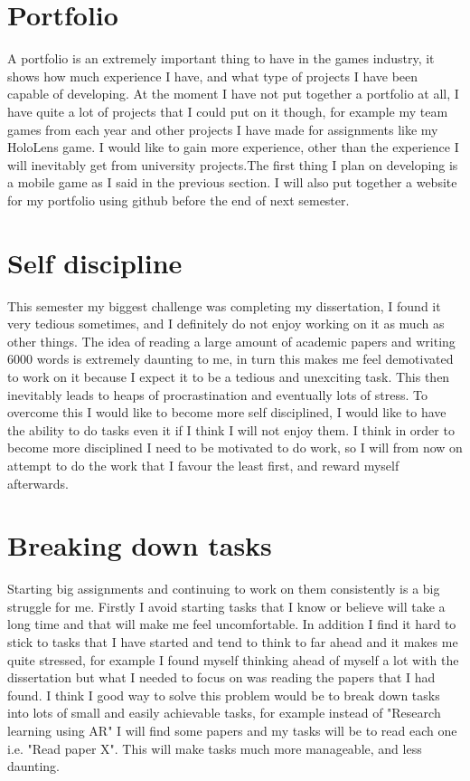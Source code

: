 \documentclass{scrartcl}
\begin{document}
\section{Portfolio}
A portfolio is an extremely important thing to have in the games industry, it shows how much experience I have, and what type of projects I have been capable of developing. At the moment I have not put together a portfolio at all, I have quite a lot of projects that I could put on it though, for example my team games from each year and other projects I have made for assignments like my HoloLens game. I would like to gain more experience, other than the experience I will inevitably get from university projects.The first thing I plan on developing is a mobile game as I said in the previous section. I will also put together a website for my portfolio using github before the end of next semester. 

\section{Self discipline}
This semester my biggest challenge was completing my dissertation, I found it very tedious sometimes, and I definitely do not enjoy working on it as much as other things. The idea of reading a large amount of academic papers and writing 6000 words is extremely daunting to me, in turn this makes me feel demotivated to work on it because I expect it to be a tedious and unexciting task. This then inevitably leads to heaps of procrastination and eventually lots of stress. To overcome this I would like to become more self disciplined, I would like to have the ability to do tasks even it if I think I will not enjoy them. I think in order to become more disciplined I need to be motivated to do work, so I will from now on attempt to do the work that I favour the least first, and reward myself afterwards.  

\section{Breaking down tasks}
Starting big assignments and continuing to work on them consistently is a big struggle for me. Firstly I avoid starting tasks that I know or believe will take a long time and that will make me feel uncomfortable. In addition I find it hard to stick to tasks that I have started and tend to think to far ahead and it makes me quite stressed, for example I found myself thinking ahead of myself a lot with the dissertation but what I needed to focus on was reading the papers that I had found. I think I good way to solve this problem would be to break down tasks into lots of small and easily achievable tasks, for example instead of "Research learning using AR" I will find some papers and my tasks will be to read each one i.e. "Read paper X". This will make tasks much more manageable, and less daunting.    
\end{document}

